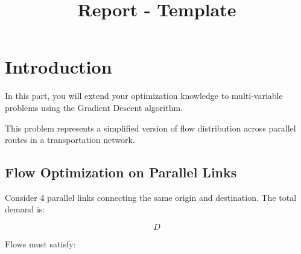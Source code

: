 \documentclass{rapportCS} %
\title{Report - Template}
\begin{document}







        
\fairemarges 
\fairepagedegarde 



\section{Introduction}

In this part, you will extend your optimization knowledge to multi-variable problems using the Gradient Descent algorithm.

This problem represents a simplified version of flow distribution across parallel routes in a transportation network.

\subsection{Flow Optimization on Parallel Links}

Consider 4 parallel links connecting the same origin and destination. The total demand is:

$$ D $$

Flows must satisfy:
\end{document}
